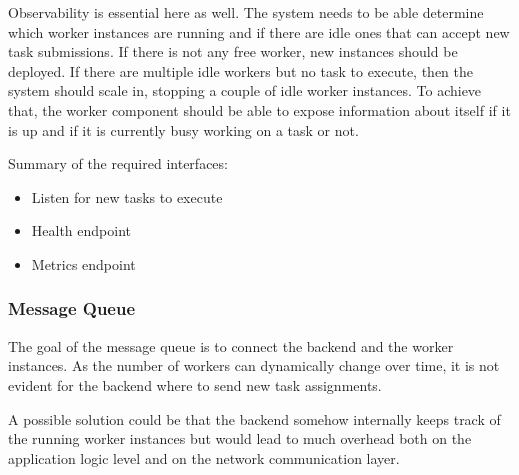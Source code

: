 Observability is essential here as well. The system needs to be able determine which worker instances are running and if there are idle ones that can accept new task submissions. If there is not any free worker, new instances should be deployed. If there are multiple idle workers but no task to execute, then the system should scale in, stopping a couple of idle worker instances. To achieve that, the worker component should be able to expose information about itself if it is up and if it is currently busy working on a task or not.

Summary of the required interfaces: \begin{itemize}
	\item Listen for new tasks to execute
	\item Health endpoint
	\item Metrics endpoint
\end{itemize}


\subsubsection{Message Queue} \label{design-message-queue}


The goal of the message queue is to connect the backend and the worker instances. As the number of workers can dynamically change over time, it is not evident for the backend where to send new task assignments.

A possible solution could be that the backend somehow internally keeps track of the running worker instances but would lead to much overhead both on the application logic level and on the network communication layer.

